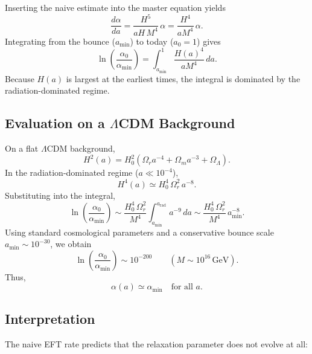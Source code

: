 \documentclass[11pt,a4paper]{article}
\begin{document}
Inserting the naive estimate into the master equation yields
\begin{equation}
    \frac{d\alpha}{da}
    = \frac{H^5}{aH\,M^4}\,\alpha
    = \frac{H^4}{aM^4}\,\alpha.
\end{equation}
Integrating from the bounce ($a_{\min}$) to today ($a_0 = 1$) gives
\begin{equation}
    \ln\!\left(\frac{\alpha_0}{\alpha_{\min}}\right)
    = \int_{a_{\min}}^{1}
      \frac{H(a)^4}{aM^4}\,da.
\end{equation}
Because $H(a)$ is largest at the earliest times, the integral is dominated by the radiation-dominated
regime.

\subsection{Evaluation on a \texorpdfstring{$\Lambda$CDM}{Lambda CDM} Background}

On a flat $\Lambda$CDM background,
\begin{equation}
    H^2(a) = H_0^2\left(\Omega_r a^{-4} + \Omega_m a^{-3} + \Omega_\Lambda\right).
\end{equation}
In the radiation-dominated regime ($a \ll 10^{-4}$),
\begin{equation}
    H^4(a) \simeq H_0^4\,\Omega_r^2\,a^{-8}.
\end{equation}
Substituting into the integral,
\begin{equation}
    \ln\!\left(\frac{\alpha_0}{\alpha_{\min}}\right)
    \sim \frac{H_0^4\,\Omega_r^2}{M^4}
         \int_{a_{\min}}^{a_{\mathrm{rad}}} a^{-9}\,da
    \sim \frac{H_0^4\,\Omega_r^2}{M^4}\,a_{\min}^{-8}.
\end{equation}
Using standard cosmological parameters and a conservative bounce scale
$a_{\min} \sim 10^{-30}$, we obtain
\begin{equation}
    \ln\!\left(\frac{\alpha_0}{\alpha_{\min}}\right)
    \sim 10^{-200}
    \qquad (M \sim 10^{16}\,\mathrm{GeV}).
\end{equation}
Thus,
\begin{equation}
    \alpha(a) \simeq \alpha_{\min}
    \quad\text{for all } a.
\end{equation}

\subsection{Interpretation}

The naive EFT rate predicts that the relaxation parameter does not evolve at all:
\end{document}
